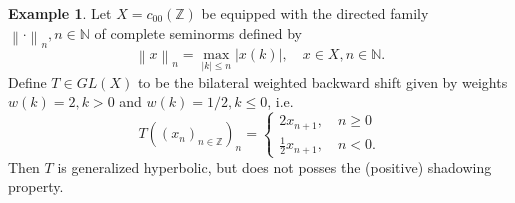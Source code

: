 \documentclass[11pt,a4paper]{amsart}
\theoremstyle{definition}
\newtheorem{example}[theorem]{Example}
\newcommand{\Z}{\mathbb{Z}}
\newcommand{\N}{\mathbb{N}}
\newcommand{\abs}[1]{\left| #1 \right|}
\newcommand{\norm}[1]{\left\| #1 \right\|}
\begin{document}
	\begin{example} \label{ex:GenHypNotShadowing}
		Let $X = c_{00}(\Z)$ be equipped with the directed family $\norm{\cdot}_n, n \in \N$ of complete seminorms defined by
		\begin{equation*}
			\norm{x}_n = \max_{\abs{k} \leq n} \abs{x(k)}, \quad x \in X, n \in \N.
		\end{equation*}
		Define $T \in GL(X)$ to be the bilateral weighted backward shift given by weights $w(k) = 2, k > 0$ and $w(k) = 1/2, k \leq 0$, i.e.
		\begin{equation*}
			T((x_n)_{n \in \Z})_n = 
			\begin{cases}
				2 x_{n+1}, \quad n \geq 0 \\
				\frac{1}{2} x_{n+1}, \quad n < 0.
			\end{cases}
		\end{equation*}
		Then $T$ is generalized hyperbolic, but does not posses the (positive) shadowing property.
	\end{example}
\end{document}

